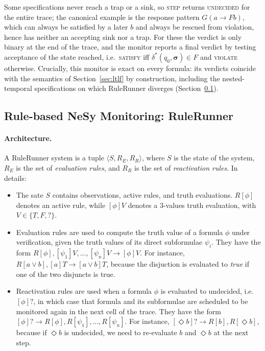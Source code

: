 Some specifications never reach a trap or a sink, so \textsc{step} returns \textsc{undecided} for the entire trace; the canonical example is the response pattern $G(a \rightarrow Fb)$, which can always be satisfied by a later $b$ and always be rescued from violation, hence has neither an accepting sink nor a trap. For these the verdict is only binary at the end of the trace, and the monitor reports a final verdict by testing acceptance of the state reached, i.e.\ \textsc{satisfy} iff $\delta^*(q_0, \boldsymbol{\sigma}) \in F$ and \textsc{violate} otherwise. Crucially, this monitor is exact on every \ltlf formula: its verdicts coincide with the semantics of Section~\ref{sec:ltlf} by construction, including the nested-temporal specifications on which RuleRunner diverges (Section~\ref{sec:rulerunner}).

\subsection{Rule-based NeSy Monitoring: RuleRunner}
\label{sec:rulerunner}

\paragraph{Architecture.}

A RuleRunner system is a tuple $\langle S,R_E,R_R \rangle$, where $S$ is the state of the system, $R_E$ is the set of \emph{evaluation rules}, and $R_R$ is the set of \emph{reactivation rules}. In details:

\begin{itemize}
    \item The sate $S$ contains observations, active rules, and truth evaluations. $R[\phi]$ denotes an active rule, while $[\phi]V$  denotes a 3-values truth evaluation, with $V \in \{T, F, ?\}$.
    \item Evaluation rules are used to compute the truth value of a formula $\phi$ under verification, given the truth values of its direct subformulae $\psi_i$. They have the form $R[\phi],[\psi_1]V,...,[\psi_n]V \rightarrow [\phi]V$. For instance, $R[a \lor b], [a]T \rightarrow [a \lor b]T$, because the disjuction is evaluated to \emph{true} if one of the two disjuncts is true.
    \item Reactivation rules are used when a formula $\phi$ is evaluated to undecided, i.e. $[\phi]?$, in which case that formula and its subformulae are scheduled to be monitored again in the next cell of the trace. They have the form $[\phi]? \rightarrow R[\phi],R[\psi_1],...,R[\psi_n]$. For instance, $[\Diamond b]? \rightarrow R[b],R[\Diamond b]$, because if $\Diamond b$ is undecided, we need to re-evaluate $b$ and $\Diamond b$ at the next step.
\end{itemize}

